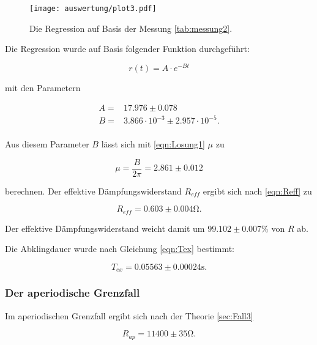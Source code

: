 \begin{figure}[H]
  \centering
  \texttt{[image: auswertung/plot3.pdf]}
  \caption{Die Regression auf Basis der Messung \ref{tab:messung2}.}
  \label{fig:regrmessung2}
\end{figure}
\noindent

Die Regression wurde auf Basis folgender Funktion durchgeführt:

\begin{equation*}
  r(t) = A \cdot e^{-B t}
\end{equation*}

mit den Parametern

\begin{align*}
  A  = & 17.976 \pm  0.078 \\
  B  = & 3.866 \cdot 10^{-3} \pm 2.957 \cdot 10^{-5}. \\
\end{align*}

Aus diesem Parameter $B$ lässt sich mit \eqref{eqn:Losung1} $\mu$ zu

\begin{equation}
  \mu = \frac{B}{2 \pi} = 2.861 \pm 0.012
  \label{eqn:mu}
\end{equation}
\noindent

berechnen.
Der effektive Dämpfungswiderstand $R_{eff}$ ergibt sich nach \eqref{eqn:Reff} zu

\begin{equation}
  R_{eff} = 0.603   \pm 0.004 \si{\ohm}.
  \label{eqn:reffauswertung}
\end{equation}
\noindent

Der effektive Dämpfungswiderstand weicht damit um $ 99.102 \pm 0.007 \si{\percent}$ von $R$ ab.

Die Abklingdauer wurde nach Gleichung \eqref{eqn:Tex} bestimmt:

\begin{equation}
  T_{ex} = 0.05563 \pm 0.00024 \si{\second}.
  \label{eqn:texauswerung}
\end{equation}
\noindent

\subsubsection{Der aperiodische Grenzfall}
Im aperiodischen Grenzfall ergibt sich nach der Theorie \ref{sec:Fall3}

\begin{equation}
  R_{ap} =  11400 \pm 35 \si{\ohm}.
  \label{eqn:rapausw1}
\end{equation}

